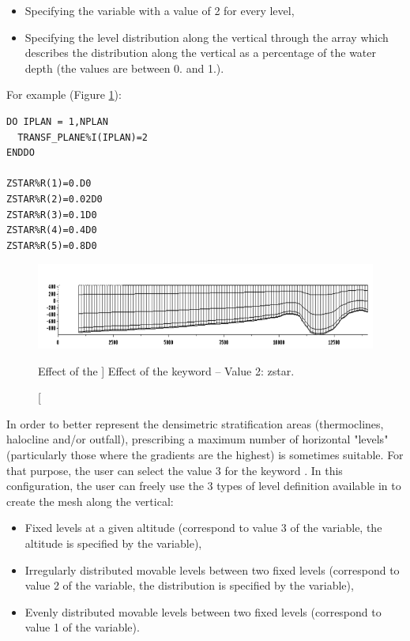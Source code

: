 \begin{itemize}
\item Specifying the variable  with a value of 2
for every level,

\item Specifying the level distribution along the vertical through the array
 which describes the distribution along the vertical as a
percentage of the water depth (the values are between 0. and 1.).
\end{itemize}

For example (Figure \ref{fig:mesh_transf2}):

\begin{lstlisting}[language=TelFortran]
DO IPLAN = 1,NPLAN
  TRANSF_PLANE%I(IPLAN)=2
ENDDO

ZSTAR%R(1)=0.D0
ZSTAR%R(2)=0.02D0
ZSTAR%R(3)=0.1D0
ZSTAR%R(4)=0.4D0
ZSTAR%R(5)=0.8D0

\end{lstlisting}

\begin{figure}[H]%
\begin{center}
%
  \includegraphics[width=\textwidth]{./graphics/mesh_transformation2}
%
\end{center}
\caption
[Effect of the ]
{Effect of the  keyword -- Value 2: zstar.}
\label{fig:mesh_transf2}
\end{figure}

In order to better represent the densimetric stratification areas
(thermoclines, halocline and/or outfall), prescribing a maximum number of
horizontal "levels" (particularly those where the gradients are the highest) is
sometimes suitable. For that purpose, the user can select the value 3 for the
keyword . In this configuration, the user can
freely use the 3 types of level definition available in  to create
the mesh along the vertical:

\begin{itemize}
\item Fixed levels at a given altitude (correspond to value 3 of the
 variable, the altitude is specified by the
 variable),

\item Irregularly distributed movable levels between two fixed levels
(correspond to value 2 of the  variable,
the distribution is specified by the  variable),

\item Evenly distributed movable levels between two fixed levels (correspond
to value 1 of the  variable).
\end{itemize}

